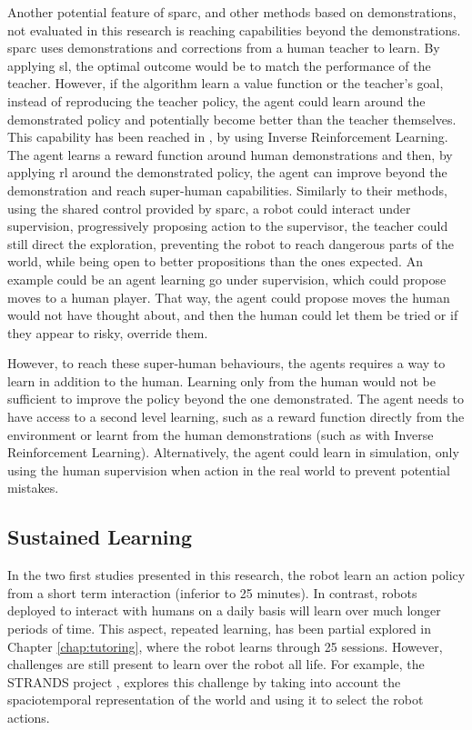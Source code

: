 Another potential feature of \gls{sparc}, and other methods based on demonstrations, not evaluated in this research is reaching capabilities beyond the demonstrations. \gls{sparc} uses demonstrations and corrections from a human teacher to learn. By applying \gls{sl}, the optimal outcome would be to match the performance of the teacher. However, if the algorithm learn a value function or the teacher's goal, instead of reproducing the teacher policy, the agent could learn around the demonstrated policy and potentially become better than the teacher themselves. This capability has been reached in \cite{abbeel2004apprenticeship}, by using Inverse Reinforcement Learning. The agent learns a reward function around human demonstrations and then, by applying \gls{rl} around the demonstrated policy, the agent can improve beyond the demonstration and reach super-human capabilities. Similarly to their methods, using the shared control provided by \gls{sparc}, a robot could interact under supervision, progressively proposing action to the supervisor, the teacher could still direct the exploration, preventing the robot to reach dangerous parts of the world, while being open to better propositions than the ones expected. An example could be an agent learning go under supervision, which could propose moves to a human player. That way, the agent could propose moves the human would not have thought about, and then the human could let them be tried or if they appear to risky, override them. 

However, to reach these super-human behaviours, the agents requires a way to learn in addition to the human. Learning only from the human would not be sufficient to improve the policy beyond the one demonstrated. The agent needs to have access to a second level learning, such as a reward function directly from the environment or learnt from the human demonstrations (such as with Inverse Reinforcement Learning). Alternatively, the agent could learn in simulation, only using the human supervision when action in the real world to prevent potential mistakes.

\subsection{Sustained Learning}

In the two first studies presented in this research, the robot learn an action policy from a short term interaction (inferior to 25 minutes). In contrast, robots deployed to interact with humans on a daily basis will learn over much longer periods of time. This aspect, repeated learning, has been partial explored in Chapter \ref{chap:tutoring}, where the robot learns through 25 sessions. However, challenges are still present to learn over the robot all life. For example, the STRANDS project \cite{hawes2017strands}, explores this challenge by taking into account the spaciotemporal representation of the world and using it to select the robot actions.

